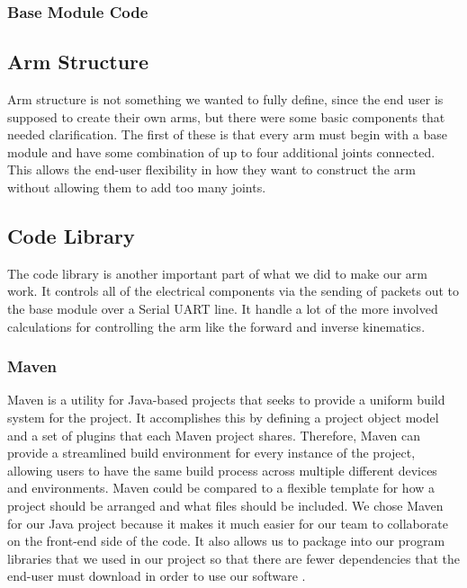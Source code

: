 \subsubsection{Base Module Code}

\subsection{Arm Structure}
Arm structure is not something we wanted to fully define, since the end user is supposed to create their own arms, but there were some basic components that needed clarification. The first of these is that every arm must begin with a base module and have some combination of up to four additional joints connected.  This allows the end-user flexibility in how they want to construct the arm without allowing them to add too many joints.


\subsection{Code Library}
The code library is another important part of what we did to make our arm work. It controls all of the electrical components via the sending of packets out to the base module over a Serial UART line. It handle a lot of the more involved calculations for controlling the arm like the forward and inverse kinematics.  


\subsubsection{Maven}
Maven is a utility for Java-based projects that seeks to provide a uniform build system for the project. It accomplishes this by defining a project object model and a set of plugins that each Maven project shares. Therefore, Maven can provide a streamlined build environment for every instance of the project, allowing users to have the same build process across multiple different devices and environments. Maven could be compared to a flexible template for how a project should be arranged and what files should be included. We chose Maven for our Java project because it makes it much easier for our team to collaborate on the front-end side of the code.  It also allows us to package into our program libraries that we used in our project so that there are fewer dependencies that the end-user must download in order to use our software \cite{maven}.


